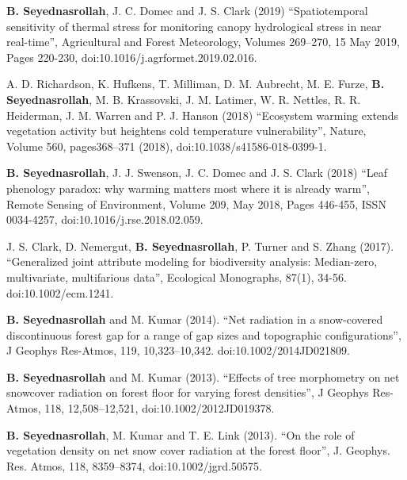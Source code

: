 \documentclass[10pt]{article}
\newenvironment{changemargin}[2]{%
  \begin{list}{}{%
 \setlength{\topsep}{0pt}%
 \setlength{\leftmargin}{#1}%
 \setlength{\rightmargin}{#2}%
 \setlength{\listparindent}{\parindent}%
 \setlength{\itemindent}{\parindent}%
 \setlength{\parsep}{\parskip}%
  }%
  \item[]}{\end{list}
}
\newenvironment{body} {
  \vspace*{-2pt}
  \begin{changemargin}{-0.5in}{-0.5in}
}
{\end{changemargin}
}
\begin{document}
\begin{body}
\begin{etaremune}
    \item \textbf{B. Seyednasrollah}, J. C. Domec and J. S. Clark (2019) ``Spatiotemporal sensitivity of thermal stress for monitoring canopy hydrological stress in near real-time'', Agricultural and Forest Meteorology, Volumes 269–270, 15 May 2019, Pages 220-230, doi:10.1016/j.agrformet.2019.02.016.\\
    \medskip

    \item A. D. Richardson, K. Hufkens, T. Milliman, D. M. Aubrecht, M. E. Furze, \textbf{B. Seyednasrollah}, M. B. Krassovski, J. M. Latimer, W. R. Nettles, R. R. Heiderman, J. M. Warren and P. J. Hanson (2018) ``Ecosystem warming extends vegetation activity but heightens cold temperature vulnerability'', Nature, Volume 560, pages368–371 (2018), doi:10.1038/s41586-018-0399-1.\\
    \medskip

    \item \textbf{B. Seyednasrollah}, J. J. Swenson, J. C. Domec and J. S. Clark (2018) ``Leaf phenology paradox: why warming matters most where it is already warm'', Remote Sensing of Environment, Volume 209, May 2018, Pages 446-455, ISSN 0034-4257, doi:10.1016/j.rse.2018.02.059.\\
    \medskip

    \item J. S. Clark, D. Nemergut, \textbf{B. Seyednasrollah}, P. Turner and S. Zhang (2017). ``Generalized joint attribute modeling for biodiversity analysis: Median-zero, multivariate, multifarious data'', Ecological Monographs, 87(1), 34-56. doi:10.1002/ecm.1241.\\
    \medskip

    \item \textbf{B. Seyednasrollah} and M. Kumar (2014). ``Net radiation in a snow-covered discontinuous forest gap for a range of gap sizes and topographic configurations'', J Geophys Res-Atmos, 119, 10,323–10,342. doi:10.1002/2014JD021809. \\
    \medskip

    \item \textbf{B. Seyednasrollah} and M. Kumar (2013). ``Effects of tree morphometry on net snowcover radiation on forest floor for varying forest densities'', J Geophys Res-Atmos, 118, 12,508–12,521, doi:10.1002/2012JD019378.\\
    \medskip

    \item \textbf{B. Seyednasrollah}, M. Kumar and T. E. Link (2013). ``On the role of vegetation density on net snow cover radiation at the forest floor'', J. Geophys. Res. Atmos, 118, 8359–8374, doi:10.1002/jgrd.50575.\\
    \medskip

  \end{etaremune}

\end{body}
\end{document}
